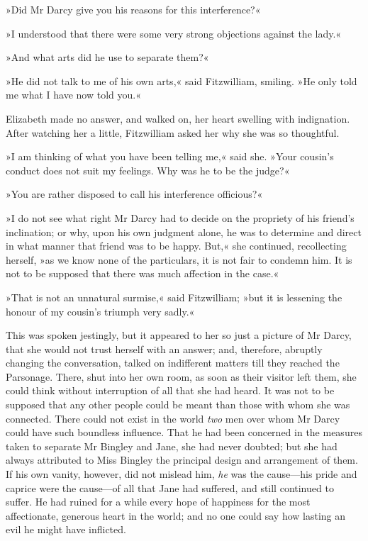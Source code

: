 »Did Mr Darcy give you his reasons for this interference?«

»I understood that there were some very strong objections against the lady.«

»And what arts did he use to separate them?«

»He did not talk to me of his own arts,« said Fitzwilliam, smiling. »He only told me what I have now told you.«

Elizabeth made no answer, and walked on, her heart swelling with indignation. After watching her a little, Fitzwilliam asked her why she was so thoughtful.

»I am thinking of what you have been telling me,« said she. »Your cousin's conduct does not suit my feelings. Why was he to be the judge?«

»You are rather disposed to call his interference officious?«

»I do not see what right Mr Darcy had to decide on the propriety of his friend's inclination; or why, upon his own judgment alone, he was to determine and direct in what manner that friend was to be happy. But,« she continued, recollecting herself, »as we know none of the particulars, it is not fair to condemn him. It is not to be supposed that there was much affection in the case.«

»That is not an unnatural surmise,« said Fitzwilliam; »but it is lessening the honour of my cousin's triumph very sadly.«

This was spoken jestingly, but it appeared to her so just a picture of Mr Darcy, that she would not trust herself with an answer; and, therefore, abruptly changing the conversation, talked on indifferent matters till they reached the Parsonage. There, shut into her own room, as soon as their visitor left them, she could think without interruption of all that she had heard. It was not to be supposed that any other people could be meant than those with whom she was connected. There could not exist in the world \textit{two} men over whom Mr Darcy could have such boundless influence. That he had been concerned in the measures taken to separate Mr Bingley and Jane, she had never doubted; but she had always attributed to Miss Bingley the principal design and arrangement of them. If his own vanity, however, did not mislead him, \textit{he} was the cause—his pride and caprice were the cause—of all that Jane had suffered, and still continued to suffer. He had ruined for a while every hope of happiness for the most affectionate, generous heart in the world; and no one could say how lasting an evil he might have inflicted.

